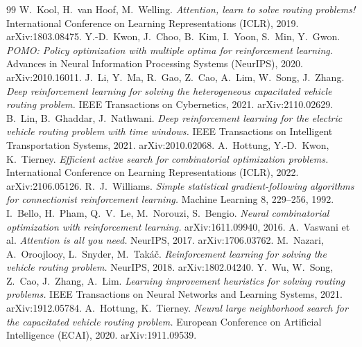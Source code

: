 \documentclass[11pt,a4paper]{article}
\theoremstyle{plain}
\theoremstyle{definition}
\renewcommand{\_}{\origunderscore\allowbreak}
\begin{document}
\tableofcontents
\newpage















\newpage
\begin{thebibliography}{99}\small
{} W.~Kool, H.~van Hoof, M.~Welling. \emph{Attention, learn to solve routing problems!} International Conference on Learning Representations (ICLR), 2019. arXiv:1803.08475.
 Y.-D.~Kwon, J.~Choo, B.~Kim, I.~Yoon, S.~Min, Y.~Gwon. \emph{POMO: Policy optimization with multiple optima for reinforcement learning.} Advances in Neural Information Processing Systems (NeurIPS), 2020. arXiv:2010.16011.
 J.~Li, Y.~Ma, R.~Gao, Z.~Cao, A.~Lim, W.~Song, J.~Zhang. \emph{Deep reinforcement learning for solving the heterogeneous capacitated vehicle routing problem.} IEEE Transactions on Cybernetics, 2021. arXiv:2110.02629.
 B.~Lin, B.~Ghaddar, J.~Nathwani. \emph{Deep reinforcement learning for the electric vehicle routing problem with time windows.} IEEE Transactions on Intelligent Transportation Systems, 2021. arXiv:2010.02068.
 A.~Hottung, Y.-D.~Kwon, K.~Tierney. \emph{Efficient active search for combinatorial optimization problems.} International Conference on Learning Representations (ICLR), 2022. arXiv:2106.05126.
 R.~J.~Williams. \emph{Simple statistical gradient-following algorithms for connectionist reinforcement learning.} Machine Learning 8, 229--256, 1992.
 I.~Bello, H.~Pham, Q.~V.~Le, M.~Norouzi, S.~Bengio. \emph{Neural combinatorial optimization with reinforcement learning.} arXiv:1611.09940, 2016.
 A.~Vaswani et al. \emph{Attention is all you need.} NeurIPS, 2017. arXiv:1706.03762.
 M.~Nazari, A.~Oroojlooy, L.~Snyder, M.~Tak\'a\v{c}. \emph{Reinforcement learning for solving the vehicle routing problem.} NeurIPS, 2018. arXiv:1802.04240.
 Y.~Wu, W.~Song, Z.~Cao, J.~Zhang, A.~Lim. \emph{Learning improvement heuristics for solving routing problems.} IEEE Transactions on Neural Networks and Learning Systems, 2021. arXiv:1912.05784.
 A.~Hottung, K.~Tierney. \emph{Neural large neighborhood search for the capacitated vehicle routing problem.} European Conference on Artificial Intelligence (ECAI), 2020. arXiv:1911.09539.

\end{thebibliography}
\end{document}
